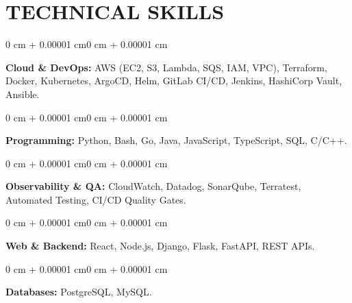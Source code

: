\documentclass[10pt, letterpaper]{article}
\newenvironment{onecolentry}{
    \begin{adjustwidth}{0 cm + 0.00001 cm}{0 cm + 0.00001 cm}
}{
    \end{adjustwidth}
}
\begin{document}
\section{TECHNICAL SKILLS}
\begin{onecolentry}
\textbf{Cloud \& DevOps:} AWS (EC2, S3, Lambda, SQS, IAM, VPC), Terraform, Docker, Kubernetes, ArgoCD, Helm, GitLab CI/CD, Jenkins, HashiCorp Vault, Ansible.
\end{onecolentry}
\vspace{0.06 cm}
\begin{onecolentry}
\textbf{Programming:} Python, Bash, Go, Java, JavaScript, TypeScript, SQL, C/C++.
\end{onecolentry}
\vspace{0.06 cm}
\begin{onecolentry}
\textbf{Observability \& QA:} CloudWatch, Datadog, SonarQube, Terratest, Automated Testing, CI/CD Quality Gates.
\end{onecolentry}
\vspace{0.06 cm}
\begin{onecolentry}
\textbf{Web \& Backend:} React, Node.js, Django, Flask, FastAPI, REST APIs.
\end{onecolentry}
\vspace{0.06 cm}
\begin{onecolentry}
\textbf{Databases:} PostgreSQL, MySQL.
\end{onecolentry}

\end{document}
